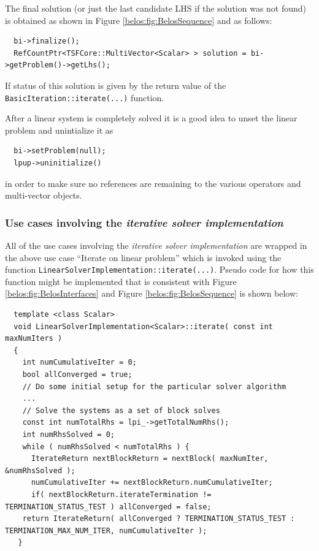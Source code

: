 \documentclass[pdf,ps2pdf,11pt]{SANDreport}
\begin{document}
\begin{enumerate}
The final solution (or just the last candidate LHS if the solution was
not found) is obtained as shown in Figure
{}\ref{belos:fig:BelosSequence} and as follows:

{\scriptsize\begin{verbatim}
  bi->finalize();
  RefCountPtr<TSFCore::MultiVector<Scalar> > solution = bi->getProblem()->getLhs();
\end{verbatim}}

If status of this solution is given by the return value of the
{}\texttt{Basic\-Iteration::\-iterate(...)} function.

After a linear system is completely solved it is a good idea to unset the
linear problem and unintialize it as

{\scriptsize\begin{verbatim}
  bi->setProblem(null);
  lpup->uninitialize()
\end{verbatim}}

{}\noindent{}in order to make sure no references are remaining to the
various operators and multi-vector objects.

\end{enumerate}

\subsubsection*{Use cases involving the {}\textit{iterative solver implementation}}

All of the use cases involving the {}\textit{iterative solver
implementation} are wrapped in the above use case ``Iterate on linear
problem'' which is invoked using the function
{}\texttt{Linear\-Solver\-Implementation::\-iterate(...)}.  Pseudo
code for how this function might be implemented that is consistent
with Figure {}\ref{belos:fig:BelosInterfaces} and Figure
{}\ref{belos:fig:BelosSequence} is shown below:

{\scriptsize\begin{verbatim}
  template <class Scalar>
  void LinearSolverImplementation<Scalar>::iterate( const int maxNumIters )
  { 
    int numCumulativeIter = 0;
    bool allConverged = true;
    // Do some initial setup for the particular solver algorithm
    ...
    // Solve the systems as a set of block solves
    const int numTotalRhs = lpi_->getTotalNumRhs();
    int numRhsSolved = 0;
    while ( numRhsSolved < numTotalRhs ) {
      IterateReturn nextBlockReturn = nextBlock( maxNumIter, &numRhsSolved );
      numCumulativeIter += nextBlockReturn.numCumulativeIter;
      if( nextBlockReturn.iterateTermination != TERMINATION_STATUS_TEST ) allConverged = false;
    return IterateReturn( allConverged ? TERMINATION_STATUS_TEST : TERMINATION_MAX_NUM_ITER, numCumulativeIter );
   }
\end{verbatim}}
\end{document}

